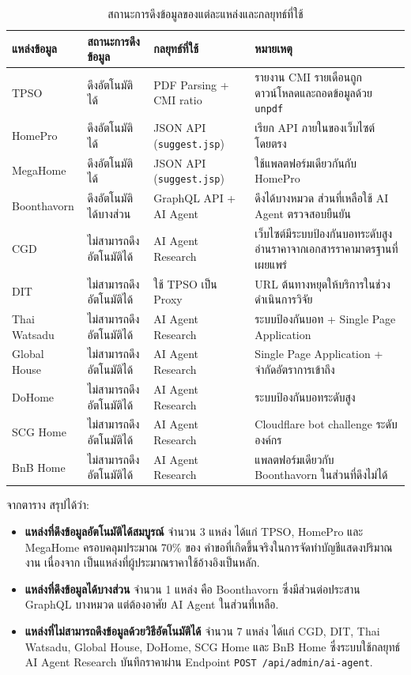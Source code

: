 \begin{table}[H]
\centering
\caption{สถานะการดึงข้อมูลของแต่ละแหล่งและกลยุทธ์ที่ใช้}
\label{tab:source-status}
\scriptsize
\begin{tabularx}{\textwidth}{l l l X}
\toprule
\textbf{แหล่งข้อมูล} & \textbf{สถานะการดึงข้อมูล} & \textbf{กลยุทธ์ที่ใช้} & \textbf{หมายเหตุ} \\
\midrule
TPSO & ดึงอัตโนมัติได้ & PDF Parsing + CMI ratio & รายงาน CMI รายเดือนถูกดาวน์โหลดและถอดข้อมูลด้วย \texttt{unpdf} \\
HomePro & ดึงอัตโนมัติได้ & JSON API (\texttt{suggest.jsp}) & เรียก API ภายในของเว็บไซต์โดยตรง \\
MegaHome & ดึงอัตโนมัติได้ & JSON API (\texttt{suggest.jsp}) & ใช้แพลตฟอร์มเดียวกันกับ HomePro \\
Boonthavorn & ดึงอัตโนมัติได้บางส่วน & GraphQL API + AI Agent & ดึงได้บางหมวด ส่วนที่เหลือใช้ AI Agent ตรวจสอบยืนยัน \\
\midrule
CGD & ไม่สามารถดึงอัตโนมัติได้ & AI Agent Research & เว็บไซต์มีระบบป้องกันบอทระดับสูง อ่านราคาจากเอกสารราคามาตรฐานที่เผยแพร่ \\
DIT & ไม่สามารถดึงอัตโนมัติได้ & ใช้ TPSO เป็น Proxy & URL ต้นทางหยุดให้บริการในช่วงดำเนินการวิจัย \\
Thai Watsadu & ไม่สามารถดึงอัตโนมัติได้ & AI Agent Research & ระบบป้องกันบอท + Single Page Application \\
Global House & ไม่สามารถดึงอัตโนมัติได้ & AI Agent Research & Single Page Application + จำกัดอัตราการเข้าถึง \\
DoHome & ไม่สามารถดึงอัตโนมัติได้ & AI Agent Research & ระบบป้องกันบอทระดับสูง \\
SCG Home & ไม่สามารถดึงอัตโนมัติได้ & AI Agent Research & Cloudflare bot challenge ระดับองค์กร \\
BnB Home & ไม่สามารถดึงอัตโนมัติได้ & AI Agent Research & แพลตฟอร์มเดียวกับ Boonthavorn ในส่วนที่ดึงไม่ได้ \\
\bottomrule
\end{tabularx}
\end{table}

จากตาราง สรุปได้ว่า:
\begin{itemize}[leftmargin=2em,itemsep=0.2em]
  \item \textbf{แหล่งที่ดึงข้อมูลอัตโนมัติได้สมบูรณ์} จำนวน 3 แหล่ง
        ได้แก่ TPSO, HomePro และ MegaHome ครอบคลุมประมาณ 70\% ของ
        คำขอที่เกิดขึ้นจริงในการจัดทำบัญชีแสดงปริมาณงาน เนื่องจาก
        เป็นแหล่งที่ผู้ประมาณราคาใช้อ้างอิงเป็นหลัก.
  \item \textbf{แหล่งที่ดึงข้อมูลได้บางส่วน} จำนวน 1 แหล่ง คือ
        Boonthavorn ซึ่งมีส่วนต่อประสาน GraphQL บางหมวด แต่ต้องอาศัย
        AI Agent ในส่วนที่เหลือ.
  \item \textbf{แหล่งที่ไม่สามารถดึงข้อมูลด้วยวิธีอัตโนมัติได้}
        จำนวน 7 แหล่ง ได้แก่ CGD, DIT, Thai Watsadu, Global House,
        DoHome, SCG Home และ BnB Home ซึ่งระบบใช้กลยุทธ์ AI Agent
        Research บันทึกราคาผ่าน Endpoint
        \texttt{POST /api/admin/ai-agent}.
\end{itemize}

